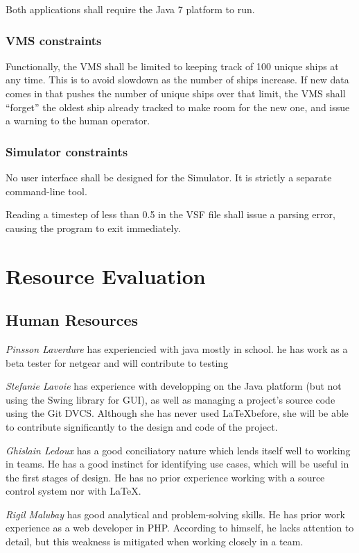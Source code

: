 \documentclass{article}
\begin{document}
Both applications shall require the Java 7 platform to run.

\subsubsection{VMS constraints}
Functionally, the VMS shall be limited to keeping track of 100 unique ships at any time. This is to avoid slowdown as the number of ships increase. If new data comes in that pushes the number of unique ships over that limit, the VMS shall ``forget'' the oldest ship already tracked to make room for the new one, and issue a warning to the human operator.

\subsubsection{Simulator constraints}

No user interface shall be designed for the Simulator. It is strictly a separate command-line tool.

Reading a timestep of less than 0.5 in the VSF file shall issue a parsing error, causing the program to exit immediately.

\section{Resource Evaluation} %

\subsection{Human Resources} %

\emph{Pinsson Laverdure} has experiencied with java mostly in school. he has work as a beta tester for netgear and will contribute to testing

\emph{Stefanie Lavoie} has experience with developping on the Java platform (but not using the Swing library for GUI), as well as managing a project's source code using the Git DVCS. Although she has never used \LaTeX before, she will be able to contribute significantly to the design and code of the project.

\emph{Ghislain Ledoux} has a good conciliatory nature which lends itself well to working in teams. He has a good instinct for identifying use cases, which will be useful in the first stages of design. He has no prior experience working with a source control system nor with \LaTeX.

\emph{Rigil Malubay} has good analytical and problem-solving skills. He has prior work experience as a web developer in PHP. According to himself, he lacks attention to detail, but this weakness is mitigated when working closely in a team.
\end{document}
